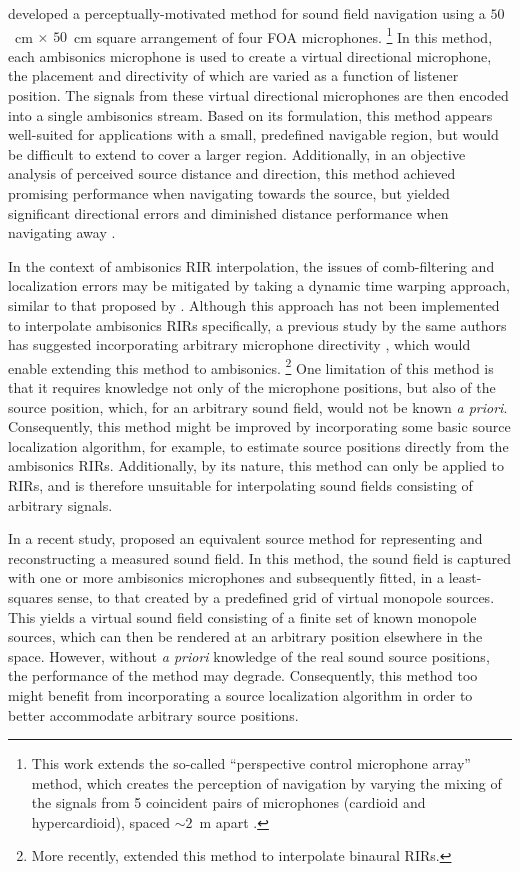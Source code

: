 \citet{Bates2018} developed a perceptually-motivated method for sound field navigation using a $50$~cm $\times$ $50$~cm square arrangement of four FOA microphones.%
\footnote{This work extends the so-called ``perspective control microphone array'' method, which creates the perception of navigation by varying the mixing of the signals from 5 coincident pairs of microphones (cardioid and hypercardioid), spaced $\sim2$~m apart \citep{Lee2011,Lee2012}.}
In this method, each ambisonics microphone is used to create a virtual directional microphone, the placement and directivity of which are varied as a function of listener position.
The signals from these virtual directional microphones are then encoded into a single ambisonics stream.
Based on its formulation, this method appears well-suited for applications with a small, predefined navigable region, but would be difficult to extend to cover a larger region.
Additionally, in an objective analysis of perceived source distance and direction, this method achieved promising performance when navigating towards the source, but yielded significant directional errors and diminished distance performance when navigating away \citep[section 3]{Bates2018}.

In the context of ambisonics RIR interpolation, the issues of comb-filtering and localization errors may be mitigated by taking a dynamic time warping approach, similar to that proposed by \citet{Masterson2009}.
Although this approach has not been implemented to interpolate ambisonics RIRs specifically, a previous study by the same authors has suggested incorporating arbitrary microphone directivity \citep{Kearney2009}, which would enable extending this method to ambisonics.%
\footnote{More recently, \citet{GarciaGomezLopez2018} extended this method to interpolate binaural RIRs.}
One limitation of this method is that it requires knowledge not only of the microphone positions, but also of the source position, which, for an arbitrary sound field, would not be known \textit{a priori}.
Consequently, this method might be improved by incorporating some basic source localization algorithm, for example, to estimate source positions directly from the ambisonics RIRs.
Additionally, by its nature, this method can only be applied to RIRs, and is therefore unsuitable for interpolating sound fields consisting of arbitrary signals.

In a recent study, \citet{FernandezGrande2016} proposed an equivalent source method for representing and reconstructing a measured sound field.
In this method, the sound field is captured with one or more ambisonics microphones and subsequently fitted, in a least-squares sense, to that created by a predefined grid of virtual monopole sources.
This yields a virtual sound field consisting of a finite set of known monopole sources, which can then be rendered at an arbitrary position elsewhere in the space.
However, without \textit{a priori} knowledge of the real sound source positions, the performance of the method may degrade.
Consequently, this method too might benefit from incorporating a source localization algorithm in order to better accommodate arbitrary source positions.

